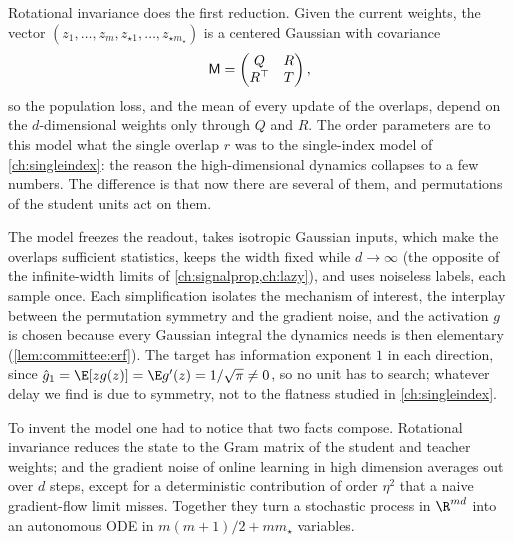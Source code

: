\begin{refsection}
Rotational invariance does the first reduction. Given the current weights, the vector $(z_1,\dots,z_m,z_{\star1},\dots,z_{\star m_\star})$ is a centered Gaussian with covariance
\begin{equation}\label{eq:committee:M}
  \mathsf{M}=\begin{pmatrix}Q&R\\R^\top&T\end{pmatrix},
\end{equation}
so the population loss, and the mean of every update of the overlaps, depend on the $d$-dimensional weights only through $Q$ and $R$. The order parameters are to this model what the single overlap $r$ was to the single-index model of \cref{ch:singleindex}: the reason the high-dimensional dynamics collapses to a few numbers. The difference is that now there are several of them, and permutations of the student units act on them.

The model freezes the readout, takes isotropic Gaussian inputs, which make the overlaps sufficient statistics, keeps the width fixed while $d\to\infty$ (the opposite of the infinite-width limits of \cref{ch:signalprop,ch:lazy}), and uses noiseless labels, each sample once. Each simplification isolates the mechanism of interest, the interplay between the permutation symmetry and the gradient noise, and the activation $g$ is chosen because every Gaussian integral the dynamics needs is then elementary (\cref{lem:committee:erf}). The target has information exponent $1$ in each direction, since $\hat g_1=\E[zg(z)]=\E g'(z)=1/\sqrt\pi\ne0$, so no unit has to search; whatever delay we find is due to symmetry, not to the flatness studied in \cref{ch:singleindex}.

To invent the model one had to notice that two facts compose. Rotational invariance reduces the state to the Gram matrix of the student and teacher weights; and the gradient noise of online learning in high dimension averages out over $d$ steps, except for a deterministic contribution of order $\eta^2$ that a naive gradient-flow limit misses. Together they turn a stochastic process in $\R^{md}$ into an autonomous ODE in $m(m+1)/2+mm_\star$ variables.


\end{refsection}
